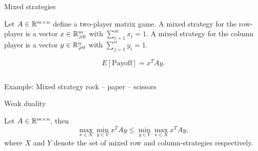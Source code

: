 \begin{frame}{Mixed strategies}

\begin{definition}
  \label{def:m1}
  Let $A \in \mathbb{R}^{m\times n}$ define a two-player matrix game. A mixed
  strategy for the row-player is a vector $x \in \mathbb{R}_{\geqslant0}^m$ with
  $\sum_{i=1}^m x_i = 1$. A mixed strategy for the column player is a
  vector $y \in  \mathbb{R}_{\geqslant0}^n$ with $\sum_{j=1}^n y_i = 1$. 
\end{definition}

\begin{equation}
  \label{eq:37}
  E[\text{Payoff}]=x^TAy. 
\end{equation}

  \begin{columns}
    \begin{column}{.5\textwidth}
      
    \end{column}
    \begin{column}{.5\textwidth}
      
    \end{column}       
  \end{columns}
\end{frame}



\begin{frame}{Example: Mixed strategy rock -- paper -- scissors}
  
\end{frame}

\begin{frame}{Weak duality}
\begin{lemma}
  \label{d:lem:10}
  Let $A \in \mathbb{R}^{m\times n}$, then 
   \begin{displaymath}
   \max_{x \in X} \min_{y\in Y} x^TA y \leq \min_{y\in Y} \max_{x\in X}
   x^TAy,       
  \end{displaymath}
  where $X$ and $Y$ denote the set of mixed row and column-strategies
  respectively. 
\end{lemma}
  \begin{columns}
    \begin{column}{.5\textwidth}
      
    \end{column}
    \begin{column}{.5\textwidth}
      
    \end{column}       
  \end{columns}
\end{frame}



